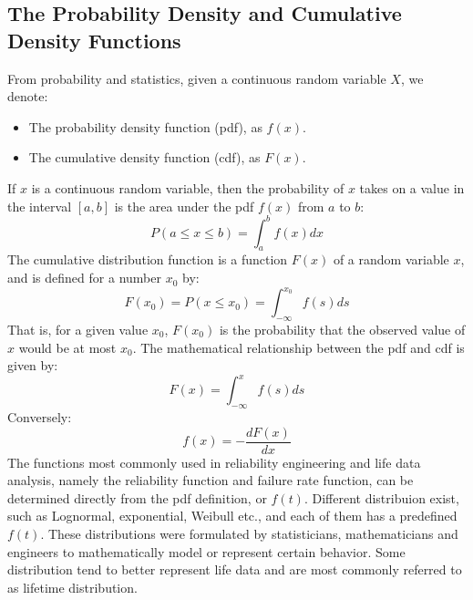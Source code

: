 \subsection{The Probability Density and Cumulative Density Functions}
From probability and statistics, given a continuous random variable $X$, we denote:
\begin{itemize}
	\item The probability density function (pdf), as $f(x)$.
	\item The cumulative density function (cdf), as $F(x)$.
\end{itemize}
If $x$ is a continuous random variable, then the probability of $x$ takes on a value in the
interval $[a,b]$ is the area under the pdf $f(x)$ from $a$ to $b$:
\begin{equation}
  P(a\leq x\leq b) = \int_{a}^{b} f(x)dx
\end{equation}
The cumulative distribution function is a function $F(x)$ of a random variable $x$, and is
defined for a number $x_0$ by:
\begin{equation}
  F(x_0) = P(x\leq x_0) = \int_{-\infty}^{x_0} f(s)ds
\end{equation}
That is, for a given value $x_0$, $F(x_0)$ is the probability that the observed value of $x$
would be at most $x_0$. The mathematical relationship between the pdf and cdf is given by:
\begin{equation}
  F(x) = \int_{-\infty}^{x} f(s)ds
\end{equation}
Conversely:
\begin{equation}
  f(x) = - \frac{dF(x)}{dx}
\end{equation}
The functions most commonly used in reliability engineering and life data analysis, namely the
reliability function and failure rate function, can be determined directly from the pdf definition,
or $f(t)$. Different distribuion exist, such as Lognormal, exponential, Weibull etc., and each of
them has a predefined $f(t)$. These distributions were formulated by statisticians, mathematicians
and engineers to mathematically model or represent certain behavior. Some distribution tend to better
represent life data and are most commonly referred to as lifetime distribution.

